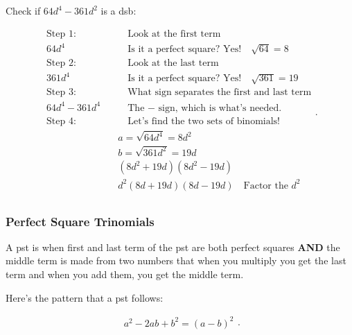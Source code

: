 \begin{example}
  \label{exm:dsb_identification}

  Check if $64d^{4} - 361d^{2}$ is a \gls{dsb}:

  \begin{equation}
    \label{eqt:dsb_identification}
    \begin{split}
      \textrm{Step 1:} \quad & \quad \textrm{Look at the first term} \\
        64d^{4} \quad & \quad \textrm{Is it a perfect square? Yes!} \quad \sqrt{64} = 8 \\
      \textrm{Step 2:} \quad & \quad \textrm{Look at the last term} \\
        361d^{4} \quad & \quad \textrm{Is it a perfect square? Yes!} \quad \sqrt{361} = 19 \\
      \textrm{Step 3:} \quad & \quad \textrm{What sign separates the first and last term} \\
        64d^{4} - 361d^{4} \quad & \quad \textrm{The $-$ sign, which is what's needed.} \\
      \textrm{Step 4:} \quad & \quad \textrm{Let's find the two sets of binomials!} \\
        & a = \sqrt{64d^{4}} = 8d^{2} \\
        & b = \sqrt{361d^{2}} = 19d \\
        & (8d^{2} + 19d)(8d^{2} - 19d) \\
        & \boxed{d^{2}(8d + 19d)(8d - 19d)} \quad \textrm{Factor the $d^{2}$} \\
    \end{split}
  .\end{equation}
\end{example}


\subsubsection{Perfect Square Trinomials}
\label{perfect_square_trinomials}

\begin{definition}
  \label{def:difference_of_squares_trinomials}

  A \gls{pst} is when first and last term of the \gls{pst} are both perfect
  squares \textbf{AND} the middle term is made from two numbers that when you
  multiply you get the last term and when you add them, you get the middle term.

  Here's the pattern that a \gls{pst} follows:

  \begin{equation}
    \label{eqt:dst_pattern}
    \begin{split}
      a^{2} - 2ab + b^{2} = (a - b)^{2}
    \end{split}
  .\end{equation}
\end{definition}

